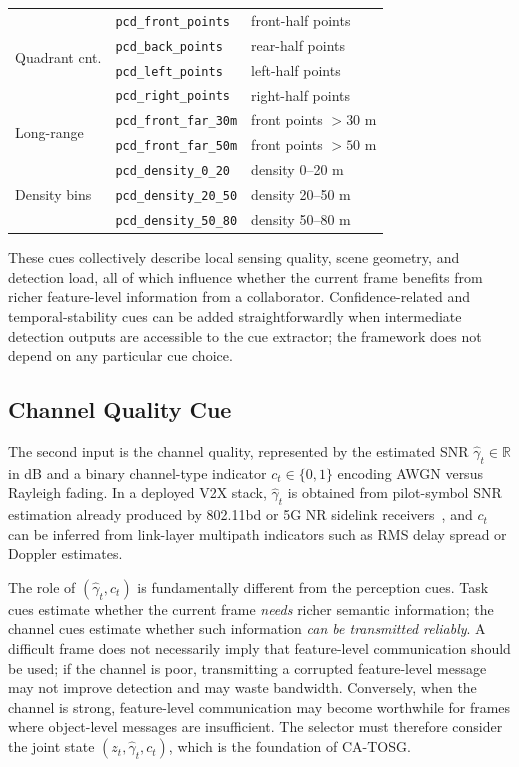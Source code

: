 \documentclass[journal]{IEEEtran}
\newcommand{\method}{CA-TOSG}
\begin{document}
\begin{table}[t]
\begin{tabular}{lll}
\midrule
\multirow{4}{*}{Quadrant cnt.} & \texttt{pcd\_front\_points}  & front-half points \\
                               & \texttt{pcd\_back\_points}   & rear-half points \\
                               & \texttt{pcd\_left\_points}   & left-half points \\
                               & \texttt{pcd\_right\_points}  & right-half points \\
\midrule
\multirow{2}{*}{Long-range}    & \texttt{pcd\_front\_far\_30m} & front points $>30$ m \\
                               & \texttt{pcd\_front\_far\_50m} & front points $>50$ m \\
\midrule
\multirow{3}{*}{Density bins}  & \texttt{pcd\_density\_0\_20}    & density 0--20 m \\
                               & \texttt{pcd\_density\_20\_50}   & density 20--50 m \\
                               & \texttt{pcd\_density\_50\_80}   & density 50--80 m \\
\bottomrule
\end{tabular}
\end{table}

These cues collectively describe local sensing quality, scene geometry, and detection load, all of which influence whether the current frame benefits from richer feature-level information from a collaborator. Confidence-related and temporal-stability cues can be added straightforwardly when intermediate detection outputs are accessible to the cue extractor; the framework does not depend on any particular cue choice.

\subsection{Channel Quality Cue}

The second input is the channel quality, represented by the estimated SNR $\hat\gamma_t \in \mathbb{R}$ in dB and a binary channel-type indicator $c_t \in \{0,1\}$ encoding AWGN versus Rayleigh fading. In a deployed V2X stack, $\hat\gamma_t$ is obtained from pilot-symbol SNR estimation already produced by 802.11bd or 5G NR sidelink receivers~\cite{ieee80211bd}, and $c_t$ can be inferred from link-layer multipath indicators such as RMS delay spread or Doppler estimates.

The role of $(\hat\gamma_t,c_t)$ is fundamentally different from the perception cues. Task cues estimate whether the current frame \emph{needs} richer semantic information; the channel cues estimate whether such information \emph{can be transmitted reliably}. A difficult frame does not necessarily imply that feature-level communication should be used; if the channel is poor, transmitting a corrupted feature-level message may not improve detection and may waste bandwidth. Conversely, when the channel is strong, feature-level communication may become worthwhile for frames where object-level messages are insufficient. The selector must therefore consider the joint state $(z_t,\hat\gamma_t,c_t)$, which is the foundation of \method{}.
\end{document}
